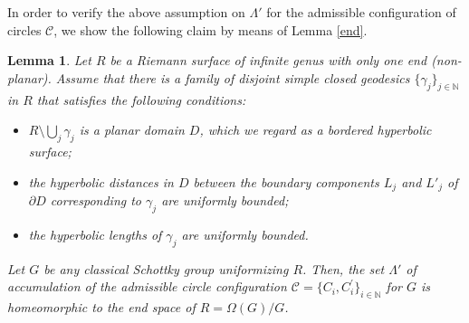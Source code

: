 \documentclass[12pt]{amsart}
\theoremstyle{plain}
\newtheorem{lem}[thm]{Lemma}
\begin{document}



In order to verify the above assumption on $\Lambda'$ for the admissible configuration of circles $\mathcal C$,
we show the following claim by means of Lemma \ref{end}.

\begin{lem}\label{end2}
Let $R$ be a Riemann surface of infinite genus with only one end (non-planar).
Assume that there is a family of disjoint simple closed geodesics $\{\gamma_j\}_{j \in \mathbb N}$ in $R$
that satisfies the following conditions:
\begin{itemize}
\item[(1)]
$R \setminus \bigcup_j \gamma_j$ is a planar domain $D$, which we regard as a bordered hyperbolic surface;
\item[(2)]
the hyperbolic distances in $D$ between the boundary components $L_j$ and $L'_j$ of $\partial D$
corresponding to $\gamma_j$ are uniformly bounded;
\item[(3)]
the hyperbolic lengths of $\gamma_j$ are uniformly bounded.
\end{itemize}
Let $G$ be any classical Schottky group uniformizing $R$.
Then, the set $\Lambda'$ of accumulation 
of the admissible  circle configuration $\mathcal{C}=\{C_i ,C_i^{\prime}\}_{i \in \mathbb N}$ 
for $G$ is homeomorphic to the end space of 
$R=\Omega(G)/G$.
\end{lem}
\end{document}
